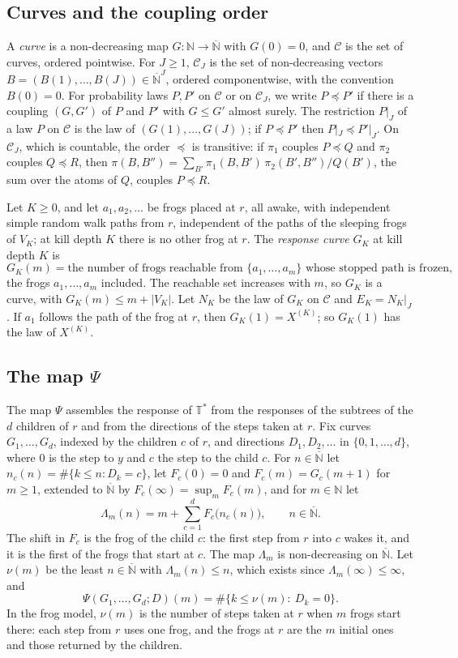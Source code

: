 \documentclass[11pt]{amsart}
\theoremstyle{definition}
\numberwithin{equation}{section}
\newcommand{\Ts}{\mathbb{T}^{*}}
\newcommand{\N}{\mathbb{N}}
\newcommand{\Nb}{\overline{\mathbb{N}}}
\newcommand{\cC}{\mathcal{C}}
\newcommand{\stle}{\preceq}
\begin{document}
\subsection{Curves and the coupling order}
A \emph{curve} is a non-decreasing map $G:\N\to\Nb$ with $G(0)=0$, and $\cC$ is the set of curves, ordered pointwise. For $J\ge1$, $\cC_J$ is the set of non-decreasing vectors $B=(B(1),\dots,B(J))\in\Nb^J$, ordered componentwise, with the convention $B(0)=0$. For probability laws $P,P'$ on $\cC$ or on $\cC_J$, we write $P\stle P'$ if there is a coupling $(G,G')$ of $P$ and $P'$ with $G\le G'$ almost surely. The restriction $P|_J$ of a law $P$ on $\cC$ is the law of $(G(1),\dots,G(J))$; if $P\stle P'$ then $P|_J\stle P'|_J$. On $\cC_J$, which is countable, the order $\stle$ is transitive: if $\pi_1$ couples $P\stle Q$ and $\pi_2$ couples $Q\stle R$, then $\pi(B,B'')=\sum_{B'}\pi_1(B,B')\,\pi_2(B',B'')/Q(B')$, the sum over the atoms of $Q$, couples $P\stle R$.

Let $K\ge0$, and let $a_1,a_2,\dots$ be frogs placed at $r$, all awake, with independent simple random walk paths from $r$, independent of the paths of the sleeping frogs of $V_K$; at kill depth $K$ there is no other frog at $r$. The \emph{response curve} $G_K$ at kill depth $K$ is
\[
G_K(m)=\text{the number of frogs reachable from } \{a_1,\dots,a_m\} \text{ whose stopped path is frozen},
\]
the frogs $a_1,\dots,a_m$ included. The reachable set increases with $m$, so $G_K$ is a curve, with $G_K(m)\le m+|V_K|$. Let $N_K$ be the law of $G_K$ on $\cC$ and $E_K=N_K|_J$. If $a_1$ follows the path of the frog at $r$, then $G_K(1)=X^{(K)}$; so $G_K(1)$ has the law of $X^{(K)}$.

\subsection{The map \texorpdfstring{$\Psi$}{Psi}}
The map $\Psi$ assembles the response of $\Ts$ from the responses of the subtrees of the $d$ children of $r$ and from the directions of the steps taken at $r$. Fix curves $G_1,\dots,G_d$, indexed by the children $c$ of $r$, and directions $D_1,D_2,\dots$ in $\{0,1,\dots,d\}$, where $0$ is the step to $y$ and $c$ the step to the child $c$. For $n\in\Nb$ let $n_c(n)=\#\{k\le n:D_k=c\}$, let $F_c(0)=0$ and $F_c(m)=G_c(m+1)$ for $m\ge1$, extended to $\Nb$ by $F_c(\infty)=\sup_mF_c(m)$, and for $m\in\N$ let
\[
\Lambda_m(n)=m+\sum_{c=1}^dF_c\bigl(n_c(n)\bigr),\qquad n\in\Nb.
\]
The shift in $F_c$ is the frog of the child $c$: the first step from $r$ into $c$ wakes it, and it is the first of the frogs that start at $c$. The map $\Lambda_m$ is non-decreasing on $\Nb$. Let $\nu(m)$ be the least $n\in\Nb$ with $\Lambda_m(n)\le n$, which exists since $\Lambda_m(\infty)\le\infty$, and
\[
\Psi(G_1,\dots,G_d;D)(m)=\#\{k\le\nu(m):\ D_k=0\}.
\]
In the frog model, $\nu(m)$ is the number of steps taken at $r$ when $m$ frogs start there: each step from $r$ uses one frog, and the frogs at $r$ are the $m$ initial ones and those returned by the children.
\end{document}

